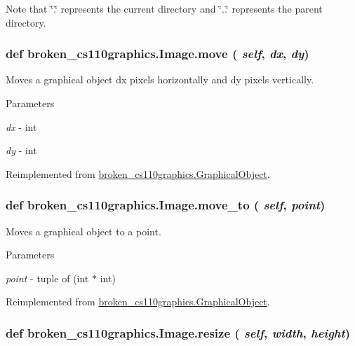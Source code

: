Note that \char`\"{}.\char`\"{} represents the current directory and \char`\"{}..\char`\"{} represents the parent directory. \hypertarget{classbroken__cs110graphics_1_1Image_a3f251e1a4abf1d9bd47034ca1f2108da}{
\subsubsection[{move}]{\setlength{\rightskip}{0pt plus 5cm}def broken\_\-cs110graphics.Image.move ( {\em self}, \/   {\em dx}, \/   {\em dy})}}
\label{classbroken__cs110graphics_1_1Image_a3f251e1a4abf1d9bd47034ca1f2108da}


Moves a graphical object dx pixels horizontally and dy pixels vertically. 
\begin{DoxyParams}{Parameters}
\item[{\em dx}]-\/ int \item[{\em dy}]-\/ int \end{DoxyParams}


Reimplemented from \hyperlink{classbroken__cs110graphics_1_1GraphicalObject_aebbdd098df38319fa08db41caad93282}{broken\_\-cs110graphics.GraphicalObject}.\hypertarget{classbroken__cs110graphics_1_1Image_a4070f6da8af60ef25ed9e0f8791cf920}{
\subsubsection[{move\_\-to}]{\setlength{\rightskip}{0pt plus 5cm}def broken\_\-cs110graphics.Image.move\_\-to ( {\em self}, \/   {\em point})}}
\label{classbroken__cs110graphics_1_1Image_a4070f6da8af60ef25ed9e0f8791cf920}


Moves a graphical object to a point. 
\begin{DoxyParams}{Parameters}
\item[{\em point}]-\/ tuple of (int $\ast$ int) \end{DoxyParams}


Reimplemented from \hyperlink{classbroken__cs110graphics_1_1GraphicalObject_ad41f02c6b8a874f21ca63bcb6a0320c5}{broken\_\-cs110graphics.GraphicalObject}.\hypertarget{classbroken__cs110graphics_1_1Image_a091c652307991279c974552524684894}{
\subsubsection[{resize}]{\setlength{\rightskip}{0pt plus 5cm}def broken\_\-cs110graphics.Image.resize ( {\em self}, \/   {\em width}, \/   {\em height})}}
\label{classbroken__cs110graphics_1_1Image_a091c652307991279c974552524684894}



